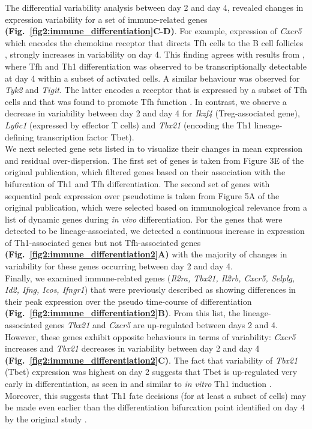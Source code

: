The differential variability analysis between day 2 and day 4, revealed  changes in expression variability for a set of immune-related genes \textbf{(Fig.~\ref{fig2:immune_differentiation}C-D)}. For example, expression of \textit{Cxcr5} which encodes the chemokine receptor that directs Tfh cells to the B cell follicles \citep{Crotty2014}, strongly increases in variability on day 4. This finding agrees with results from \cite{Lonnberg2017}, where Tfh and Th1 differentiation was observed to be transcriptionally detectable at day 4 within a subset of activated cells. A similar behaviour was observed for \textit{Tyk2} and \textit{Tigit}. The latter encodes a receptor that is expressed by a subset of Tfh cells and that was found to promote Tfh function \citep{Godefroy2015}. In contrast, we observe a decrease in variability between day 2 and day 4 for \textit{Ikzf4} (Treg-associated gene), \textit{Ly6c1} (expressed by effector T cells) and \textit{Tbx21} (encoding the Th1 lineage-defining transcription factor Tbet). \\

We next selected gene sets listed in \cite{Lonnberg2017} to visualize their changes in mean expression and residual over-dispersion. The first set of genes is taken from Figure 3E of the original publication, which filtered genes based on their association with the bifurcation of Th1 and Tfh differentiation. The second set of genes with sequential peak expression over pseudotime is taken from Figure 5A of the original publication, which were selected based on immunological relevance from a list of dynamic genes during \textit{in vivo} differentiation. For the genes that were detected to be lineage-associated, we detected a continuous increase in expression of Th1-associated genes but not Tfh-associated genes \textbf{(Fig.~\ref{fig2:immune_differentiation2}A)} with the majority of changes in variability for these genes occurring between day 2 and day 4. \\

Finally, we examined immune-related genes (\textit{Il2ra, Tbx21, Il2rb, Cxcr5, Selplg, Id2, Ifng, Icos, Ifngr1}) that were previously described as showing differences in their peak expression over the pseudo time-course of differentiation \citep{Lonnberg2017} \textbf{(Fig.~\ref{fig2:immune_differentiation2}B)}. From this list, the lineage-associated genes \textit{Tbx21} and \textit{Cxcr5} are up-regulated between days 2 and 4. However, these genes  exhibit opposite behaviours in terms of variability: \textit{Cxcr5} increases and \textit{Tbx21} decreases in variability between day 2 and day 4 \textbf{(Fig.~\ref{fig2:immune_differentiation2}C)}. The fact that variability of \textit{Tbx21} (Tbet) expression was highest on day 2 suggests that Tbet is up-regulated very early in differentiation, as seen in \cite{Lonnberg2017} and similar to \textit{in vitro} Th1 induction \citep{Szabo2000}. Moreover, this suggests that Th1 fate decisions (for at least a subset of cells) may be made even earlier than the differentiation bifurcation point identified on day 4 by the original study \citep{Lonnberg2017}. 

